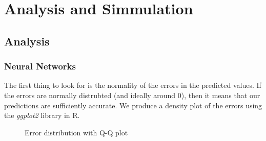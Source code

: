 \chapter{Analysis and Simmulation}

\section{Analysis}
\subsection{Neural Networks}
The first thing to look for is the normality of the errors in the predicted values. If the errors are normally distrubted (and ideally around 0),
then it means that our predictions are sufficiently accurate. We produce a density plot of the errors using the \textit{ggplot2} library in R.

\begin{figure}[h]
    \centering
    \qquad
    \caption{Error distribution with Q-Q plot}
    \label{errDistAndQQ}
\end{figure}


